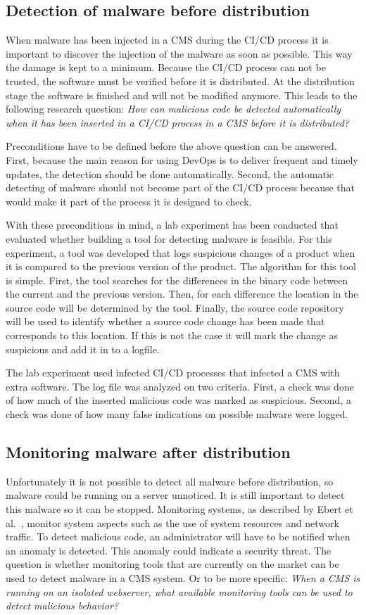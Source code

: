 \documentclass[a4paper, 10pt, conference]{ieeeconf}
\begin{document}
\subsection{Detection of malware before distribution}
When malware has been injected in a CMS during the CI/CD process it is important to discover the injection of the malware as soon as possible. This way the damage is kept to a minimum. Because the CI/CD process can not be trusted, the software must be verified before it is distributed. At the distribution stage the software is finished and will not be modified anymore. This leads to the following research question: \textit{How can malicious code be detected automatically when it has been inserted in a CI/CD process in a CMS before it is distributed?}

Preconditions have to be defined before the above question can be answered. First, because the main reason for using DevOps is to deliver frequent and timely updates, the detection should be done automatically. Second, the automatic detecting of malware should not become part of the CI/CD process because that would make it part of the process it is designed to check.

With these preconditions in mind, a lab experiment has been conducted that evaluated whether building a tool for detecting malware is feasible. For this experiment, a tool was developed that logs suspicious changes of a product when it is compared to the previous version of the product. The algorithm for this tool is simple. First, the tool searches for the differences in the binary code between the current and the previous version. Then, for each difference the location in the source code will be determined by the tool. Finally, the source code repository will be used to identify whether a source code change has been made that corresponds to this location. If this is not the case it will mark the change as suspicious and add it in to a logfile.

The lab experiment used infected CI/CD processes that infected a CMS with extra software. The log file was analyzed on two criteria. First, a check was done of how much of the inserted malicious code was marked as suspicious. Second, a check was done of how many false indications on possible malware were logged.

\subsection{Monitoring malware after distribution}
Unfortunately it is not possible to detect all malware before distribution, so malware could be running on a server unnoticed. It is still important to detect this malware so it can be stopped. Monitoring systems, as described by Ebert et al.~\cite{7458761}, monitor system aspects such as the use of system resources and network traffic. To detect malicious code, an administrator will have to be notified when an anomaly is detected. This anomaly could  indicate a security threat. The question is whether monitoring tools that are currently on the market can be used to detect malware in  a CMS system. Or to be more specific: \textit{When a CMS is running on an isolated webserver, what available monitoring tools can be used to detect malicious behavior?}
\end{document}
